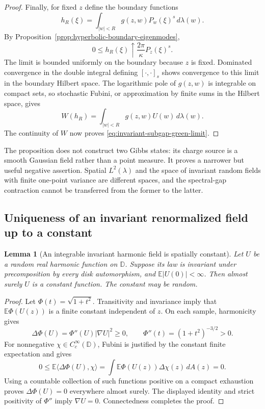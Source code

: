 \documentclass[11pt,a4paper]{article}
\numberwithin{equation}{section}
\newtheorem{lemma}[theorem]{Lemma}
\theoremstyle{definition}
\theoremstyle{remark}
\newcommand{\E}{\mathbb E}
\begin{document}
\begin{proof}
Finally, for fixed $z$ define the boundary functions
\[
 h_R(\xi)=\int_{|w|<R}g(z,w)P_w(\xi)^s\,d\lambda(w).
\]
By Proposition~\ref{prop:hyperbolic-boundary-eigenmodes},
\[
 0\le h_R(\xi)\uparrow\frac{2\pi}{\kappa}P_z(\xi)^s.
\]
The limit is bounded uniformly on the boundary because $z$ is
fixed.  Dominated convergence in the double integral defining
$[\cdot,\cdot]_s$ shows convergence to this limit in the boundary
Hilbert space.  The logarithmic pole of $g(z,w)$ is integrable on
compact sets, so stochastic Fubini, or approximation by finite
sums in the Hilbert space, gives
\[
 W(h_R)=\int_{|w|<R}g(z,w)U(w)\,d\lambda(w).
\]
The continuity of $W$ now proves
\eqref{eq:invariant-subgap-green-limit}.
\end{proof}

The proposition does not construct two Gibbs states: its charge
source is a smooth Gaussian field rather than a point measure.
It proves a narrower but useful negative assertion.  Spatial
$L^2(\lambda)$ and the space of invariant random fields with finite
one-point variance are different spaces, and the spectral-gap
contraction cannot be transferred from the former to the latter.

\subsection{Uniqueness of an invariant renormalized field up to a constant}

\begin{lemma}[An integrable invariant harmonic field is spatially constant]
\label{lem:integrable-invariant-harmonic-field}
Let $U$ be a random real harmonic function on $\mathbb D$.  Suppose
its law is invariant under precomposition by every disk automorphism,
and $\E|U(0)|<\infty$.  Then almost surely $U$ is a constant function.
The constant may be random.
\end{lemma}

\begin{proof}
Let $\Phi(t)=\sqrt{1+t^2}$.  Transitivity and invariance imply that
$\E\Phi(U(z))$ is a finite constant independent of $z$.  On each
sample, harmonicity gives
\[
 \Delta\Phi(U)=\Phi''(U)|\nabla U|^2\ge0,
 \qquad \Phi''(t)=(1+t^2)^{-3/2}>0.
\]
For nonnegative $\chi\in C_c^\infty(\mathbb D)$, Fubini is justified
by the constant finite expectation and gives
\[
 0\le\E\langle\Delta\Phi(U),\chi\rangle
     =\int\E\Phi(U(z))\Delta\chi(z)\,dA(z)=0.
\]
Using a countable collection of such functions positive on a compact
exhaustion proves $\Delta\Phi(U)=0$ everywhere almost surely.
The displayed identity and strict positivity of $\Phi''$ imply
$\nabla U=0$.  Connectedness completes the proof.
\end{proof}
\end{document}
